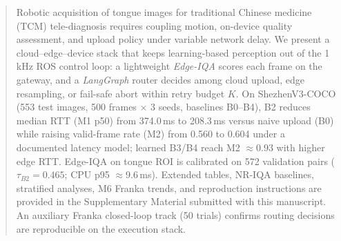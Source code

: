 \begin{abstract}
Robotic acquisition of tongue images for traditional Chinese medicine (TCM) tele-diagnosis requires coupling motion, on-device quality assessment, and upload policy under variable network delay.
We present a cloud--edge--device stack that keeps learning-based perception out of the 1\,kHz ROS control loop: a lightweight \emph{Edge-IQA} scores each frame on the gateway, and a \emph{LangGraph} router decides among cloud upload, edge resampling, or fail-safe abort within retry budget $K$.
On ShezhenV3-COCO (553 test images, 500 frames $\times$ 3 seeds, baselines B0--B4), B2 reduces median RTT (M1 p50) from 374.0\,ms to 208.3\,ms versus naive upload (B0) while raising valid-frame rate (M2) from 0.560 to 0.604 under a documented latency model; learned B3/B4 reach M2 $\approx 0.93$ with higher edge RTT.
Edge-IQA on tongue ROI is calibrated on 572 validation pairs ($\tau_{B2}{=}0.465$; CPU p95 $\approx$9.6\,ms).
Extended tables, NR-IQA baselines, stratified analyses, M6 Franka trends, and reproduction instructions are provided in the Supplementary Material submitted with this manuscript.
An auxiliary Franka closed-loop track (50 trials) confirms routing decisions are reproducible on the execution stack.
\end{abstract}
